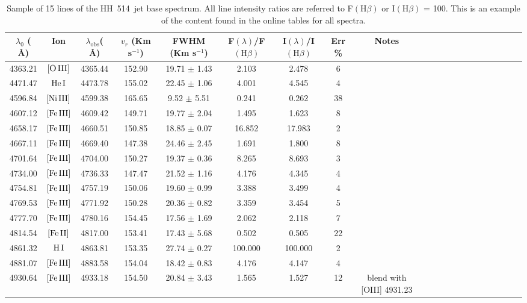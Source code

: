 \documentclass[fleqn,usenatbib]{mnras}
\begin{document}
\begin{table}
\caption{Sample of 15 lines of the HH~514~jet base spectrum. All line intensity ratios are referred to F$\left( \mbox{H}\beta \right)$ or I$\left( \mbox{H}\beta \right)$ = 100. This is an example of the content found in the online tables for all spectra.}
\label{tab:sample_spectra}
\begin{tabular}{ccccccccccccccccccccc}
\hline
$\lambda_0$ ( \AA ) & Ion & $\lambda_{\text{obs}}$( \AA ) & $v_r$ (Km s$^{-1}$) & FWHM (Km s$^{-1}$) & F$\left( \lambda \right)$/F$\left( \mbox{H}\beta \right)$ & I$\left( \lambda \right)$/I$\left( \mbox{H}\beta \right)$ & Err \% & Notes \\
\hline
4363.21 & $\mbox{[O}\thinspace \mbox{III]}$ & 4365.44 & 152.90 & 19.71 $\pm$ 1.43 & 2.103 & 2.478 & 6 &  \\
4471.47 & $\mbox{He}\thinspace \mbox{I}$ & 4473.78 & 155.02 & 22.45 $\pm$ 1.06 & 4.001 & 4.545 & 4 &  \\
4596.84 & $\mbox{[Ni}\thinspace \mbox{III]}$ & 4599.38 & 165.65 & 9.52 $\pm$ 5.51 & 0.241 & 0.262 & 38 &  \\
4607.12 & $\mbox{[Fe}\thinspace \mbox{III]}$ & 4609.42 & 149.71 & 19.77 $\pm$ 2.04 & 1.495 & 1.623 & 8 &  \\
4658.17 & $\mbox{[Fe}\thinspace \mbox{III]}$ & 4660.51 & 150.85 & 18.85 $\pm$ 0.07 & 16.852 & 17.983 & 2 &  \\
4667.11 & $\mbox{[Fe}\thinspace \mbox{III]}$ & 4669.40 & 147.38 & 24.46 $\pm$ 2.45 & 1.691 & 1.800 & 8 &  \\
4701.64 & $\mbox{[Fe}\thinspace \mbox{III]}$ & 4704.00 & 150.27 & 19.37 $\pm$ 0.36 & 8.265 & 8.693 & 3 &  \\
4734.00 & $\mbox{[Fe}\thinspace \mbox{III]}$ & 4736.33 & 147.47 & 21.52 $\pm$ 1.16 & 4.176 & 4.345 & 4 &  \\
4754.81 & $\mbox{[Fe}\thinspace \mbox{III]}$ & 4757.19 & 150.06 & 19.60 $\pm$ 0.99 & 3.388 & 3.499 & 4 &  \\
4769.53 & $\mbox{[Fe}\thinspace \mbox{III]}$ & 4771.92 & 150.28 & 20.36 $\pm$ 0.82 & 3.359 & 3.454 & 5 &  \\
4777.70 & $\mbox{[Fe}\thinspace \mbox{III]}$ & 4780.16 & 154.45 & 17.56 $\pm$ 1.69 & 2.062 & 2.118 & 7 &  \\
4814.54 & $\mbox{[Fe}\thinspace \mbox{II]}$ & 4817.00 & 153.41 & 17.43 $\pm$ 5.68 & 0.502 & 0.505 & 22 &  \\
4861.32 & $\mbox{H}\thinspace \mbox{I}$ & 4863.81 & 153.35 & 27.74 $\pm$ 0.27 & 100.000 & 100.000 & 2 &  \\
4881.07 & $\mbox{[Fe}\thinspace \mbox{III]}$ & 4883.58 & 154.04 & 18.42 $\pm$ 0.83 & 4.176 & 4.147 & 4 &  \\
4930.64 & $\mbox{[Fe}\thinspace \mbox{III]}$ & 4933.18 & 154.50 & 20.84 $\pm$ 3.43 & 1.565 & 1.527 & 12 &  blend with [O\thinspace III] 4931.23 \\
\hline
\end{tabular}
\end{table}
\end{document}
